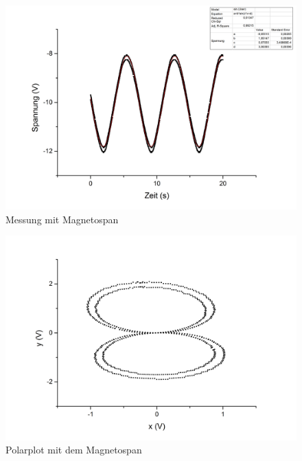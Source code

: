\begin{figure}[h]
\begin{center}
\includegraphics[scale=0.6]{Bilder/m1}
\caption{Messung mit Magnetospan}
\end{center}
\end{figure}
\begin{figure}[h]
\begin{center}
\includegraphics[scale=0.6]{Bilder/pm1}
\caption{Polarplot mit dem Magnetospan}
\end{center}
\end{figure}
